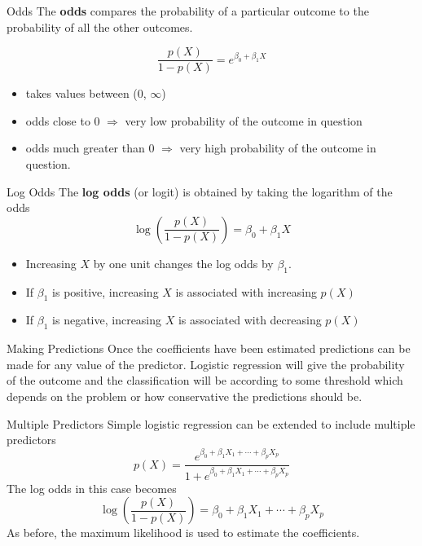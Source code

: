 \documentclass[
  ignorenonframetext,
  aspectratio=169,
]{beamer}
\begin{document}
\begin{frame}{Odds}
\protect\hypertarget{odds}{}
The \textbf{odds} compares the probability of a particular outcome to
the probability of all the other outcomes.

\[
    \frac{p(X)}{1-p(X)}=e^{\beta_{0}+\beta_{1} X}
\]

\begin{itemize}
\item
  takes values between (0, \(\infty\))
\item
  odds close to 0 \(\Rightarrow\) very low probability of the outcome in
  question
\item
  odds much greater than 0 \(\Rightarrow\) very high probability of the
  outcome in question.
\end{itemize}
\end{frame}

\begin{frame}{Log Odds}
\protect\hypertarget{log-odds}{}
The \textbf{log odds} (or logit) is obtained by taking the logarithm of
the odds \[
    \log \left(\frac{p(X)}{1-p(X)}\right)=\beta_{0}+\beta_{1} X
\]

\begin{itemize}
\item
  Increasing \(X\) by one unit changes the log odds by \(\beta_1\).
\item
  If \(\beta_1\) is positive, increasing \(X\) is associated with
  increasing \(p(X)\)
\item
  If \(\beta_1\) is negative, increasing \(X\) is associated with
  decreasing \(p(X)\)
\end{itemize}
\end{frame}

\begin{frame}{Making Predictions}
\protect\hypertarget{making-predictions}{}
Once the coefficients have been estimated predictions can be made for
any value of the predictor. Logistic regression will give the
probability of the outcome and the classification will be according to
some threshold which depends on the problem or how conservative the
predictions should be.
\end{frame}

\begin{frame}{Multiple Predictors}
\protect\hypertarget{multiple-predictors}{}
Simple logistic regression can be extended to include multiple
predictors \[
p(X)=\frac{e^{\beta_{0}+\beta_{1} X_{1}+\cdots+\beta_{p} X_{p}}}{1+e^{\beta_{0}+\beta_{1} X_{1}+\cdots+\beta_{p} X_{p}}}
\] The log odds in this case becomes \[
\log \left(\frac{p(X)}{1-p(X)}\right)=\beta_{0}+\beta_{1} X_{1}+\cdots+\beta_{p} X_{p}
\] As before, the maximum likelihood is used to estimate the
coefficients.
\end{frame}
\end{document}
